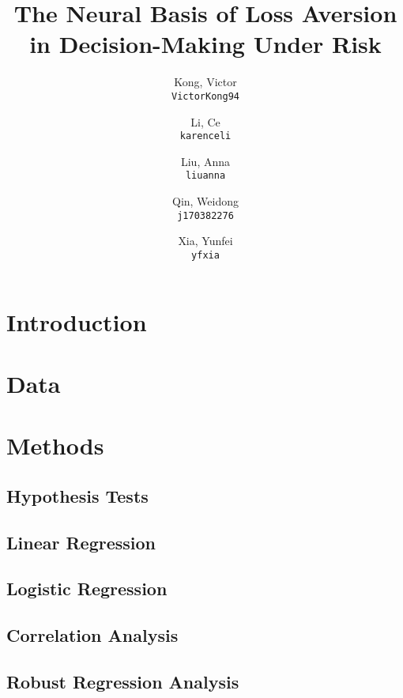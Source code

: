 \documentclass[11pt]{article}
\title{The Neural Basis of Loss Aversion in Decision-Making Under Risk}
\author{
  Kong, Victor\\
  \texttt{VictorKong94}
  \and
  Li, Ce\\
  \texttt{karenceli}
  \and
  Liu, Anna\\
  \texttt{liuanna}
  \and
  Qin, Weidong\\
  \texttt{j170382276}
  \and
  Xia, Yunfei\\
  \texttt{yfxia}
}
\begin{document}
\maketitle

\abstract{}

\section{Introduction}
	

\section{Data}

	
	
\section{Methods}

	\subsection{Hypothesis Tests}
	
		
			
	\subsection{Linear Regression}
	
		
		
	\subsection{Logistic Regression}
	
		
		
	\subsection{Correlation Analysis}
	
		
		
	\subsection{Robust Regression Analysis}
	
		
\end{document}
